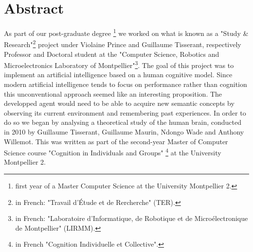 \chapter*{Abstract}

As part of our post-graduate degree \footnote{first year of a Master Computer Science at the University Montpellier 2.} we worked on what is known as a "Study \& Research"\footnote{in French: "Travail d'Étude et de Rercherche" (TER).} project under \mbox{Violaine} \mbox{Prince} and \mbox{Guillaume} \mbox{Tisserant}, respectively Professor and Doctoral student at the "Computer Science, Robotics and Microelectronics Laboratory of Montpellier"\footnote{in French: "Laboratoire d'Informatique, de Robotique et de Microélectronique de Montpellier" (LIRMM).}. 
The goal of this project was to implement an artificial intelligence based on a human cognitive model. Since modern artificial intelligence tends to focus on performance rather than cognition this unconventional approach seemed like an interesting proposition. The developped agent would need to be able to acquire new semantic concepts by observing its current environment and remembering past experiences. 
In order to do so we began by analysing a theoretical study of the human brain, conducted in 2010 by \mbox{Guillaume} \mbox{Tisserant}, \mbox{Guillaume} \mbox{Maurin}, \mbox{Ndongo} \mbox{Wade} and \mbox{Anthony} \mbox{Willemot}. This was written as part of the second-year Master of Computer Science course "Cognition in Individuals and Groups" \footnote{in French "Cognition Individuelle et Collective".} at the University Montpellier 2.
